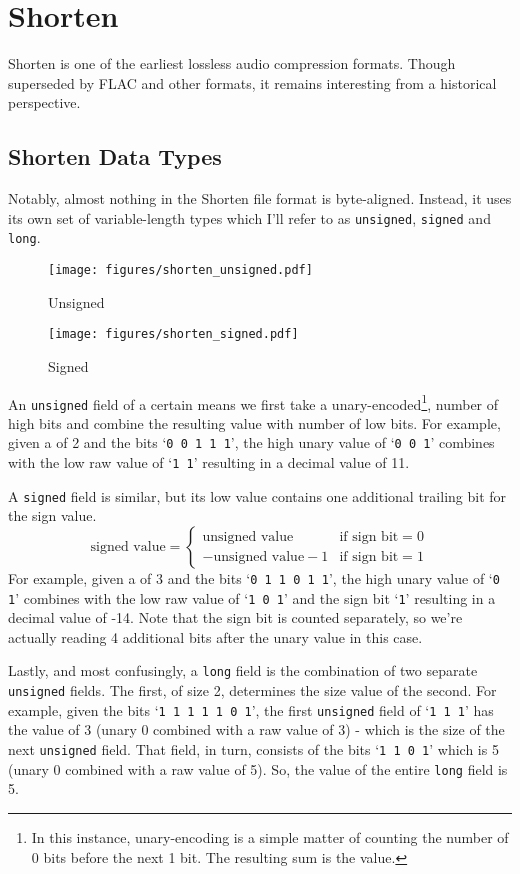 \chapter{Shorten}
Shorten is one of the earliest lossless audio compression formats.
Though superseded by FLAC and other formats, it remains interesting
from a historical perspective.

\section{Shorten Data Types}
Notably, almost nothing in the Shorten file format is byte-aligned.
Instead, it uses its own set of variable-length types which I'll
refer to as \texttt{unsigned}, \texttt{signed} and \texttt{long}.

\begin{wrapfigure}[16]{r}{2in}
\texttt{[image: figures/shorten\_unsigned.pdf]}
\caption{Unsigned}
\texttt{[image: figures/shorten\_signed.pdf]}
\caption{Signed}
\end{wrapfigure}
An \texttt{unsigned} field of a certain  means we first
take a unary-encoded\footnote{In this instance, unary-encoding is a simple
matter of counting the number of 0 bits before the next 1 bit.
The resulting sum is the value.}, number of high bits and combine
the resulting value with  number of low bits.
For example, given a  of 2 and the bits `\texttt{0 0 1 1 1}',
the high unary value of `\texttt{0 0 1}' combines with the low
raw value of `\texttt{1 1}' resulting in a decimal value of 11.

A \texttt{signed} field is similar, but its low value contains
one additional trailing bit for the sign value.
{
\begin{equation*}
\text{signed value} =
\begin{cases}
\text{unsigned value} & \text{if sign bit} = 0 \\
-\text{unsigned value} - 1 & \text{if sign bit} = 1
\end{cases}
\end{equation*}
}
For example, given a  of 3 and the bits `\texttt{0 1 1 0 1 1}',
the high unary value of `\texttt{0 1}' combines with the low
raw value of `\texttt{1 0 1}' and the sign bit `\texttt{1}'
resulting in a decimal value of -14.
Note that the sign bit is counted separately, so we're
actually reading 4 additional bits after the unary value in this case.

Lastly, and most confusingly, a \texttt{long} field is the combination
of two separate \texttt{unsigned} fields.
The first, of size 2, determines the size value of the second.
For example, given the bits `\texttt{1 1 1 1 1 0 1}',
the first \texttt{unsigned} field of `\texttt{1 1 1}' has the value
of 3 (unary 0 combined with a raw value of 3) - which is the size
of the next \texttt{unsigned} field.
That field, in turn, consists of the bits `\texttt{1 1 0 1}'
which is 5 (unary 0 combined with a raw value of 5).
So, the value of the entire \texttt{long} field is 5.

